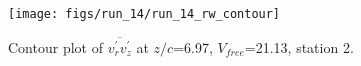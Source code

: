 \begin{figure}[H]
\centering
\texttt{[image: figs/run\_14/run\_14\_rw\_contour]}
\caption{Contour plot of $\overline{v_{r}^{\prime} v_{z}^{\prime}}$ at $z/c$=6.97, $V_{free}$=21.13, station 2.}
\label{fig:run_14_rw_contour}
\end{figure}


